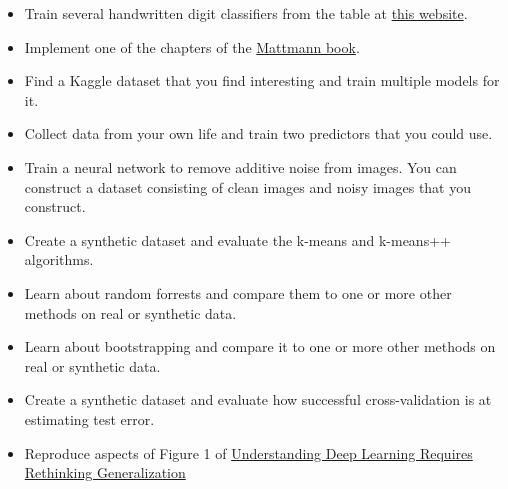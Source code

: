 \documentclass[11pt]{article}
\theoremstyle{definition}
\theoremstyle{theorem}
\begin{document}
\begin{itemize}
\item  Train several handwritten digit classifiers from the table at \href{http://yann.lecun.com/exdb/mnist/}{this website}.  
\item Implement one of the chapters of the \href{https://www.manning.com/books/machine-learning-with-tensorflow-second-edition}{Mattmann book}.
\item Find a Kaggle dataset that you find interesting and train multiple models for it.
\item Collect data from your own life and train two predictors that you could use.  
\item Train a neural network to remove additive noise from images.  You can construct a dataset consisting of clean images and noisy images that you construct.
\item Create a synthetic dataset and evaluate the k-means and k-means++ algorithms.
\item Learn about random forrests and compare them to one or more other methods on real or synthetic data.
\item Learn about bootstrapping and compare it to one or more other methods on real or synthetic data.
\item Create a synthetic dataset and evaluate how successful cross-validation is at estimating test error.
\item Reproduce aspects of Figure 1 of \href{https://arxiv.org/abs/1611.03530}{Understanding Deep Learning Requires Rethinking Generalization}


\end{itemize}
\end{document}
